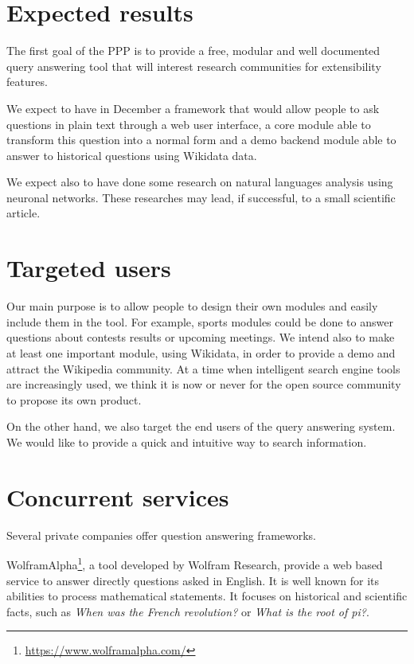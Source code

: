 \documentclass[a4paper,10pt]{article}
\begin{document}
\section{Expected results}
The first goal of the PPP is to provide a free, modular and well documented
query answering tool that will interest research communities for extensibility features. 

We expect to have in December a framework that would allow people to ask
questions in plain text through a web user interface, a core module able to transform
this question into a normal form and a demo backend module able to answer
to historical questions using Wikidata data.

We expect also to have done some research on natural languages analysis using
neuronal networks. These researches may lead, if successful, to
a small scientific article.

\section{Targeted users}

Our main purpose is to allow people to design their own modules and
easily include them in the tool. For example, sports modules could be done to 
answer questions about contests results or 
upcoming meetings.  We intend also to make at least one important module, using 
Wikidata, in order to provide a demo and attract the Wikipedia community. 
At a time when intelligent search engine tools are increasingly used, we think it 
is now or never for the open source community to propose its own product.

On the other hand, we also target the end users of the query answering system. We
would like to provide a quick and intuitive way to search information.

\section{Concurrent services}

Several private companies offer question answering frameworks. 

WolframAlpha\footnote{\url{https://www.wolframalpha.com/}}, a tool developed by 
Wolfram Research, provide a web based service to answer directly questions asked
in English. It is well known for its abilities to process mathematical statements.
It focuses on historical and scientific facts, such as \emph{When was the French 
revolution?} or \emph{What is the root of pi?}.
\end{document}
